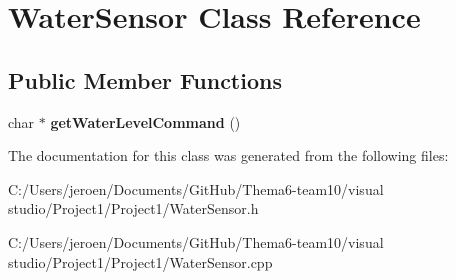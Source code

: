 \hypertarget{class_water_sensor}{}\section{Water\+Sensor Class Reference}
\label{class_water_sensor}
\subsection*{Public Member Functions}
\begin{DoxyCompactItemize}
\item 
char $\ast$ {\bfseries get\+Water\+Level\+Command} ()\hypertarget{class_water_sensor_ab48d856949f14f8b6a04739f46393caa}{}\label{class_water_sensor_ab48d856949f14f8b6a04739f46393caa}

\end{DoxyCompactItemize}


The documentation for this class was generated from the following files\+:\begin{DoxyCompactItemize}
\item 
C\+:/\+Users/jeroen/\+Documents/\+Git\+Hub/\+Thema6-\/team10/visual studio/\+Project1/\+Project1/Water\+Sensor.\+h\item 
C\+:/\+Users/jeroen/\+Documents/\+Git\+Hub/\+Thema6-\/team10/visual studio/\+Project1/\+Project1/Water\+Sensor.\+cpp\end{DoxyCompactItemize}
